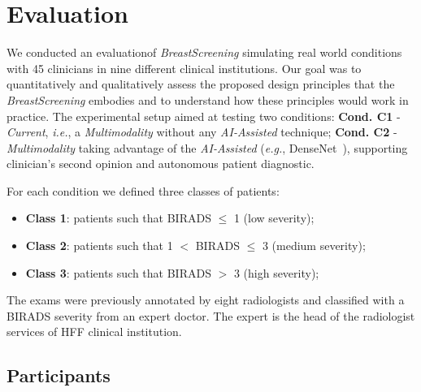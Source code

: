 \section{Evaluation}
\label{sec:methods}

We conducted an evaluation\footnotemark[5] of {\it BreastScreening} simulating real world conditions with 45 clinicians in nine different clinical institutions.
Our goal was to quantitatively and qualitatively assess the proposed design principles that the {\it BreastScreening} embodies and to understand how these principles would work in practice.
The experimental setup aimed at testing two conditions: \textbf{Cond. C1} - {\it Current}, {\it i.e.}, a {\it Multimodality} without any {\it AI-Assisted} technique; \textbf{Cond. C2} - {\it Multimodality} taking advantage of the  {\it AI-Assisted} ({\it e.g.}, DenseNet~\cite{maicas2019unsupervised}), supporting clinician's second opinion and autonomous patient diagnostic.


\noindent
For each condition we defined three classes of patients:

\begin{itemize}
\item {\bf Class 1}: patients such that BIRADS $\leq$ 1 (low severity);
\item {\bf Class 2}: patients such that 1 $<$ BIRADS $\leq$ 3 (medium severity);
\item {\bf Class 3}: patients such that BIRADS $>$ 3 (high severity);
\end{itemize}

The exams were previously annotated by eight radiologists and classified with a BIRADS severity from an expert doctor.
The expert is the head of the radiologist services of HFF clinical institution.

\subsection{Participants}
\label{sec:participants}

